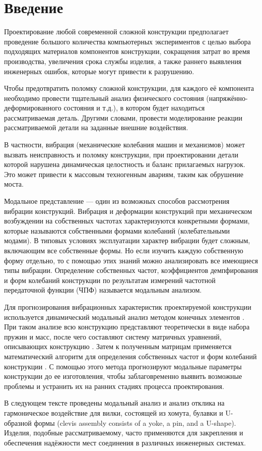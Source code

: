 \chapter*{Введение} %

Проектирование любой современной сложной конструкции предполагает проведение большого количества компьютерных экспериментов с целью выбора подходящих материалов компонентов конструкции, сокращения затрат во время производства, увеличения срока службы изделия, а также раннего выявления инженерных ошибок, которые могут привести к разрушению.

Чтобы предотвратить поломку сложной конструкции, для каждого её компонента необходимо провести тщательный анализ физического состояния (напряжённо-деформированного состояния и т.д.), в котором будет находиться рассматриваемая деталь. Другими словами, провести моделирование реакции рассматриваемой детали на заданные внешние воздействия.

В частности, вибрация (механические колебания машин и механизмов) может вызвать неисправность и поломку конструкции, при проектировании детали которой нарушена динамическая целостность и баланс прилагаемых нагрузок. Это может привести к массовым техногенным авариям, таким как обрушение моста.

Модальное представление \cite{berns_modal_analysis} — один из возможных способов рассмотрения вибрации конструкций. Вибрация и деформации конструкций при механическом возбуждении на собственных частотах характеризуются конкретными формами, которые называются собственными формами колебаний (колебательными модами). В типовых условиях эксплуатации характер вибрации будет сложным, включающим все собственные формы. Но если изучить каждую собственную форму отдельно, то с помощью этих знаний можно анализировать все имеющиеся типы вибрации. Определение собственных частот, коэффициентов демпфирования и форм колебаний конструкции по результатам измерений частотной передаточной функции (ЧПФ) называется модальным анализом.

Для прогнозирования вибрационных характеристик проектируемой конструкции используется динамический модальный анализ методом конечных элементов \cite{fea_in_engin}. При таком анализе всю конструкцию представляют теоретически в виде набора пружин и масс, после чего составляют систему матричных уравнений, описывающих конструкцию \cite{practical_fea}. Затем к полученным матрицам применяется математический алгоритм для определения собственных частот и форм колебаний конструкции \cite{chen_ansys}. С помощью этого метода прогнозируют модальные параметры конструкции до ее изготовления, чтобы заблаговременно выявить возможные проблемы и устранить их на ранних стадиях процесса проектирования.

В следующем тексте проведены модальный анализ и анализ отклика на гармоническое воздействие для вилки, состоящей из хомута, булавки и U-образной формы (clevis assembly consists of a yoke, a pin, and a U-shape). Изделия, подобные рассматриваемому, часто применяются для закрепления и обеспечения надёжности мест соединения в различных инженерных системах.




